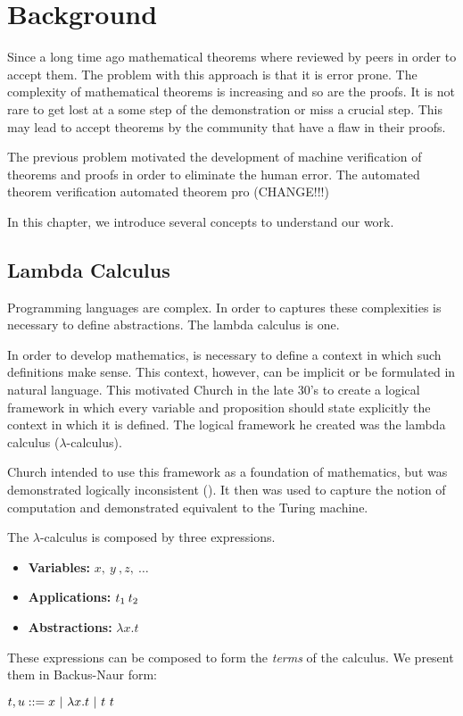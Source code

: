 \chapter{Background}
\label{ch:introduction}

Since a long time ago mathematical theorems where reviewed by peers in order to accept them. The problem with
this approach is that it is error prone. The complexity of mathematical theorems is increasing and so are the 
proofs. It is not rare to get lost at a some step of the demonstration or miss a crucial step. This may lead to 
accept theorems by the community that have a flaw in their proofs.

The previous problem motivated the development of machine verification of theorems and proofs in order to 
eliminate the human error. The automated theorem verification  automated theorem pro (CHANGE!!!)

In this chapter, we introduce several concepts to understand our work. 

\section{Lambda Calculus}
\newcommand{\lambdaCalc}{$\lambda$-calculus}
Programming languages are complex. In order to captures these complexities is necessary 
to define abstractions. The lambda calculus is one. 

In order to develop mathematics, is necessary to define a context in which such definitions make sense. This
context, however, can be implicit or be formulated in natural language.
This motivated Church in the late 30's to create a logical framework
in which every variable and proposition should state explicitly the context in which it is defined.
The logical framework he created was the lambda calculus (\lambdaCalc{})\cite{Church:lambdaIntro}. 

Church intended to use this framework as a foundation of mathematics, but  was demonstrated logically
inconsistent (\cite{KleeneRosser:InconsistencyLogix}). It then was used to capture the
notion of computation \cite{Church:lambdaComputable} and demonstrated equivalent to the Turing machine.

The \lambdaCalc{} is composed by three expressions.
\begin{itemize}
    \item \textbf{Variables:} $x,\ y\ ,z,\ \dots$
    \item \textbf{Applications:} $\app{t_1}{t_2}$
    \item \textbf{Abstractions:} $\lambda x.t$
\end{itemize}
These expressions can be composed to form the \emph{terms}
of the calculus. We present them in Backus-Naur form:
\begin{center}
    $t,u ::= \x{}\ |\ \lambda x.t\ |\ t\ t$
\end{center}

